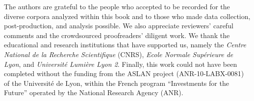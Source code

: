
The authors are grateful to the people who accepted to be recorded for the diverse corpora analyzed within this book and to those who made data collection, post-production, and analysis possible. We also appreciate reviewers' careful comments and the crowdsourced proofreaders' diligent work. We thank the educational and research institutions that have supported us, namely the \textit{Centre National de la Recherche Scientifique} (CNRS), \textit{Ecole Normale Supérieure de Lyon}, and \textit{Université Lumière Lyon 2}. Finally, this work could not have been completed without the funding from the ASLAN project (ANR-10-LABX-0081) of the Université de Lyon, within the French program “Investments for the Future” operated by the National Research Agency (ANR).
